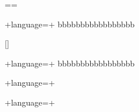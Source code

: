 \documentclass[english,ngerman,ttfont=roboto]{tudscrmanual}
\begin{document}

==

\begin{Declaration}[v2.07]{}
\begin{Declaration}[v2.07]{+language=+}
\printdeclarationlist
bbbbbbbbbbbbbbbbb
\end{Declaration}
\end{Declaration}

\begin{Declaration}[v2.07]{[\LParameter]}
\begin{Declaration}[v2.07]{+language=+}
\printdeclarationlist
bbbbbbbbbbbbbbbbb
\end{Declaration}
\end{Declaration}

\bigskip


+language=+

\bigskip


+language=+


%
%



\clearpage
\end{document}
